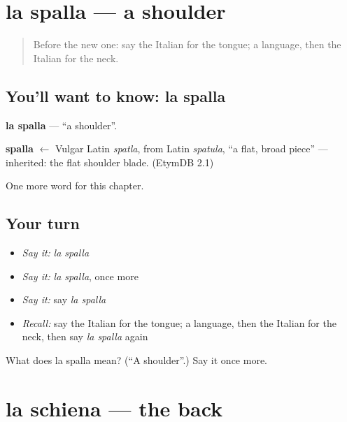 \section[la spalla]{la spalla — a shoulder}

\label{lesson:IT-C38-spalla}



\begin{quote}
Before the new one: say the Italian for the tongue; a language, then the Italian for the neck.
\end{quote}

\subsection*{You'll want to know: la spalla}
\textbf{la spalla} — \textquotedblleft{}a shoulder\textquotedblright{}.

\begin{cousinweb}
\textbf{spalla} $\leftarrow$ Vulgar Latin \emph{spatla}, from Latin \emph{spatula}, \textquotedblleft{}a flat, broad piece\textquotedblright{} — inherited: the flat shoulder blade. (EtymDB 2.1)
\end{cousinweb}

\begin{grammarlens}[title={What you've built}]
One more word for this chapter.
\end{grammarlens}

\subsection*{Your turn}
\begin{itemize}
\raggedright
  \item \emph{Say it:} \emph{la spalla}
  \item \emph{Say it:} \emph{la spalla}, once more
  \item \emph{Say it:} say \emph{la spalla}
  \item \emph{Recall:} say the Italian for the tongue; a language, then the Italian for the neck, then say \emph{la spalla} again
\end{itemize}

\begin{tcolorbox}[breakable,colback=teal!4,colframe=teal!35!black,title={Before you move on}]
What does la spalla mean? (\textquotedblleft{}A shoulder\textquotedblright{}.) Say it once more.
\end{tcolorbox}
\section[la schiena]{la schiena — the back}

